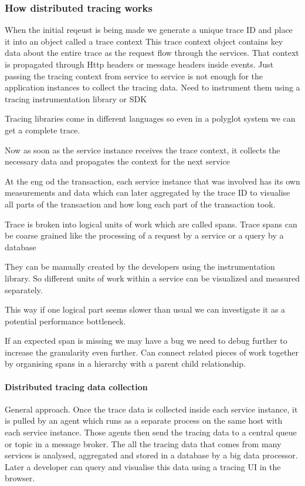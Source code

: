 \documentclass[a4paper, 11pt]{book}
\begin{document}
    \subsubsection{How distributed tracing works}
    When the initial reqeust is being made we generate a unique trace ID and place it into an object called a trace context
    This trace context object contains key data about the entire trace as the request flow through the services.
    That context is propagated through Http headers or message headers inside events.
    Just passing the tracing context from service to service is not enough for the application instances to collect the tracing data.
    Need to instrument them using a tracing instrumentation library or SDK

    Tracing libraries come in different languages so even in a polyglot system we can get a complete trace.

    Now as soon as the service instance receives the trace context, it collects the necessary data and propagates the context for the next service

    At the eng od the transaction, each service instance that was involved has its own measurements and data which can later aggregated by the trace ID to visualise all parts of the transaction and how long each part of the transaction took.

    Trace is broken into logical units of work which are called spans.
    Trace spans can be coarse grained like the processing of a request by a service or a query by a database

    They can be manually created by the developers using the instrumentation library.
    So different units of work within a service can be visualized and measured separately.

    This way if one logical part seems slower than usual we can investigate it as a potential performance bottleneck.

    If an expected span is missing we may have a bug we need to debug further to increase the granularity even further.
    Can connect related pieces of work together by organising spans in a hierarchy with a parent child relationship.

    \paragraph{Distributed tracing data collection}
    General approach.
    Once the trace data is collected inside each service instance, it is pulled by an agent which runs as a separate process on the same host with each service instance.
    Those agents then send the tracing data to a central queue or topic in a message broker.
    The all the tracing data that comes from many services is analysed, aggregated and stored in a database by a big data processor.
    Later a developer can query and visualise this data using a tracing UI in the browser.
\end{document}
